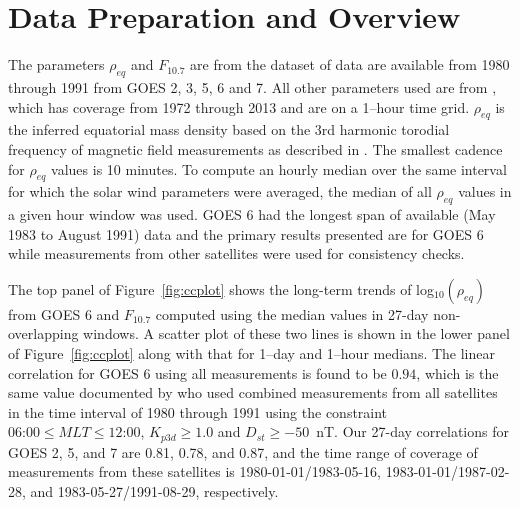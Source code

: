 \documentclass[12pt]{article}
\begin{document}


\section{Data Preparation and Overview}

The parameters $\rho_{eq}$ and $F_{10.7}$ are from the dataset of \cite{Takahashi2010} data are available from 1980 through 1991 from GOES 2, 3, 5, 6 and 7.  All other parameters used are from \cite{Kondrashov2014ReconstructionOfGaps}, which has coverage from 1972 through 2013 and are on a 1--hour time grid. $\rho_{eq}$ is the inferred equatorial mass density based on the 3rd harmonic torodial frequency of magnetic field measurements as described in \cite{Takahashi2010}.  The smallest cadence for $\rho_{eq}$ values is 10 minutes.  To compute an hourly median over the same interval for which the solar wind parameters were averaged, the median of all $\rho_{eq}$ values in a given hour window was used. GOES 6 had the longest span of available (May 1983 to August 1991) data and the primary results presented are for GOES 6 while measurements from other satellites were used for consistency checks.


The top panel of Figure~\ref{fig:ccplot} shows the long-term trends of log$_{10}(\rho_{eq})$ from GOES 6 and $F_{10.7}$ computed using the median values in 27-day non-overlapping windows.  A scatter plot of these two lines is shown in the lower panel of Figure~\ref{fig:ccplot} along with that for 1--day and 1--hour medians.  The linear correlation for GOES 6 using all measurements is found to be $0.94$, which is the same value documented by \cite{Takahashi2010} who used combined measurements from all satellites in the time interval of 1980 through 1991 using the constraint $06\mbox{:}00 \leq MLT \le 12\mbox{:}00$, $K_{p3d}\ge1.0$ and $D_{st}\ge -50$~nT.  Our 27-day correlations for GOES 2, 5, and 7 are 0.81, 0.78, and 0.87, and the time range of coverage of measurements from these satellites is 1980-01-01/1983-05-16, 1983-01-01/1987-02-28, and 1983-05-27/1991-08-29, respectively.
\end{document}
